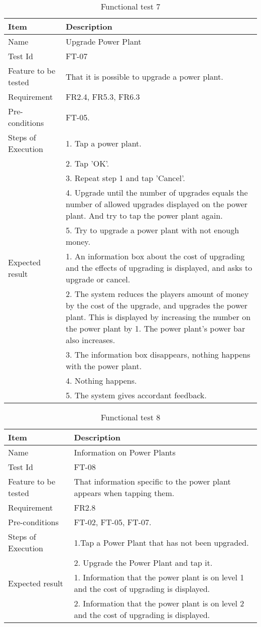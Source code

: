 \begin{table}[H]
\centering
	\begin{tabular}{ l | p{8cm} }
		\hline
		{\bf Item} & {\bf Description} \\ \hline
		Name & Upgrade Power Plant\\ 
		Test Id & FT-07 \\ 
		Feature to be tested & That it is possible to upgrade a power plant. \\ 
		Requirement & FR2.4, FR5.3, FR6.3 \\ 
		Pre-conditions & FT-05. \\ 
		Steps of Execution & 1. Tap a power plant. \\ 
		& 2. Tap 'OK'. \\
		& 3. Repeat step 1 and tap 'Cancel'. \\
		& 4. Upgrade until the number of upgrades equals the number of allowed upgrades displayed on the power plant. And try to tap the power plant again. \\
		& 5. Try to upgrade a power plant with not enough money. \\
		Expected result & 1. An information box about the cost of upgrading and the effects of upgrading is displayed, and asks to upgrade or cancel. \\
		& 2. The system reduces the players amount of money by the cost of the upgrade, and upgrades the power plant. This is displayed by increasing the number on the power plant by 1. The power plant's power bar also increases. \\
		& 3. The information box disappears, nothing happens with the power plant. \\
		& 4. Nothing happens. \\
		& 5. The system gives accordant feedback. \\
	\end{tabular}
	\caption{Functional test 7}
\end{table}

\begin{table}[H]
\centering
	\begin{tabular}{ l | p{8cm} }
		\hline
		{\bf Item} & {\bf Description} \\ \hline
		Name & Information on Power Plants \\ 
		Test Id & FT-08 \\ 
		Feature to be tested & That information specific to the power plant appears when tapping them. \\ 
		Requirement & FR2.8 \\ 
		Pre-conditions & FT-02, FT-05, FT-07. \\ 
		Steps of Execution & 1.Tap a Power Plant that has not been upgraded. \\
		& 2. Upgrade the Power Plant and tap it. \\
		Expected result & 1. Information that the power plant is on level 1 and the cost of upgrading is displayed. \\
		& 2. Information that the power plant is on level 2 and the cost of upgrading is displayed. \\
	\end{tabular}
	\caption{Functional test 8}
\end{table}

